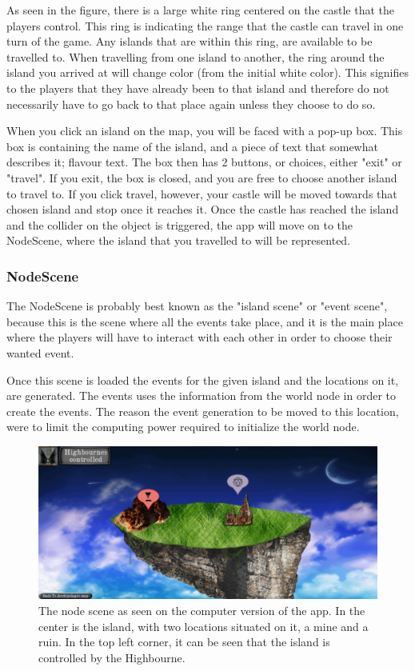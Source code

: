 As seen in the figure, there is a large white ring centered on the castle that the players control. This ring is indicating the range that the castle can travel in one turn of the game. Any islands that are within this ring, are available to be travelled to.
When travelling from one island to another, the ring around the island you arrived at will change color (from the initial white color). This signifies to the players that they have already been to that island and therefore do not necessarily have to go back to that place again unless they choose to do so.

When you click an island on the map, you will be faced with a pop-up box. This box is containing the name of the island, and a piece of text that somewhat describes it; flavour text. The box then has 2 buttons, or choices, either "exit" or "travel". If you exit, the box is closed, and you are free to choose another island to travel to. If you click travel, however, your castle will be moved towards that chosen island and stop once it reaches it. 
Once the castle has reached the island and the collider on the object is triggered, the app will move on to the NodeScene, where the island that you travelled to will be represented.

\subsubsection{NodeScene}
\label{sec:nodeScene}
The NodeScene is probably best known as the "island scene" or "event scene", because this is the scene where all the events take place, and it is the main place where the players will have to interact with each other in order to choose their wanted event.

Once this scene is loaded the events for the given island and the locations on it, are generated. The events uses the information from the world node in order to create the events. The reason the event generation to be moved to this location, were to limit the computing power required to initialize the world node. 

\begin{figure}[h]
    \centering
    \includegraphics[scale=0.3]{Images/NodeScene.png}
    \caption{The node scene as seen on the computer version of the app. In the center is the island, with two locations situated on it, a mine and a ruin. In the top left corner, it can be seen that the island is controlled by the Highbourne.}
    \label{fig:nodescene}
\end{figure}

